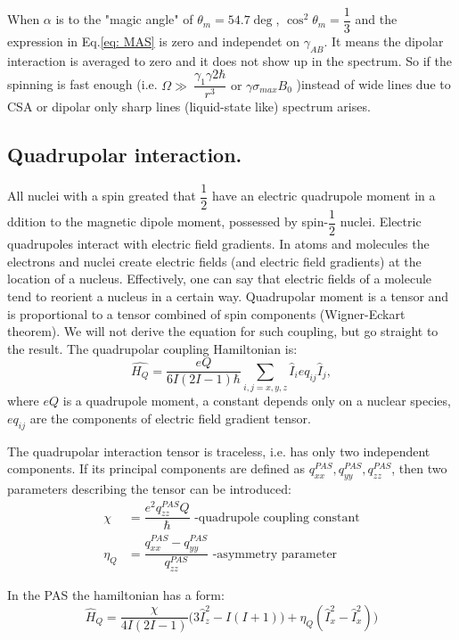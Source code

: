 \documentclass{beamer}
\begin{document}
\begin{frame}
	 When $\alpha$ is to the "magic angle" of $\theta_m =54.7 \deg$, $\cos^2 \theta_m = \dfrac{1}{3}$ and the expression in Eq.\ref{eq: MAS} is zero and independet on $\gamma_{AB}$. It means the dipolar interaction is averaged to zero and it does not show up in the spectrum. 
	 So if the spinning is fast enough (i.e. $\Omega \gg \ \dfrac{\gamma_1 \gamma2 \hbar}{r^3} \text{ or } \gamma \sigma_{max} B_0$  )instead of wide lines due to CSA or dipolar only sharp lines (liquid-state like) spectrum arises. 
\end{frame}

\subsection{Quadrupolar interaction.}
\begin{frame}
	All nuclei with a spin greated that $\dfrac{1}{2}$ have an electric quadrupole moment in a ddition to the magnetic dipole moment, possessed by spin-$\dfrac{1}{2}$ nuclei. Electric quadrupoles interact with electric field gradients. 
	In atoms and molecules the electrons and nuclei create electric fields (and electric field gradients) at the location of a nucleus. Effectively, one can say that electric fields of a molecule tend to reorient a nucleus in a certain way.  Quadrupolar moment is a tensor and is proportional to a tensor combined of spin components (Wigner-Eckart theorem). We will not derive the equation for such coupling, but go straight to the result. The quadrupolar coupling Hamiltonian is:
	\begin{equation}
	   \hat{H_Q} = \dfrac{eQ}{6I(2I-1)\hbar} \sum_{i,j=x,y,z} \hat{I}_i e q_{ij}  \hat{I}_j, 
	\end{equation}
	where $eQ$ is a quadrupole moment, a constant depends only on a nuclear species, $e q_{ij}$ are the components of electric field gradient tensor. 
\end{frame}
\begin{frame}
	
	The quadrupolar interaction tensor is traceless, i.e. has only two independent components. If its principal components are defined as $q_{xx}^{PAS}, q_{yy}^{PAS}, q_{zz}^{PAS}$, then two parameters describing the tensor can be introduced:
	\begin{align}
	   \chi &= \dfrac{e^2 q_{zz}^{PAS} Q}{\hbar}  \text{   -quadrupole coupling constant} \\
	   \eta_Q &= \dfrac{q_{xx}^{PAS} - q_{yy}^{PAS}}{q_{zz}^{PAS}} \text{  -asymmetry parameter}
	\end{align}
	
	In the PAS the hamiltonian has a form:
	\begin{equation}
		\hat{H}_Q = \dfrac{\chi }{4 I (2I-1)}\Big(3 \hat{I}_z^2 - I(I+1) ) + \eta_Q(\hat{I}_x^2 -\hat{I}_x^2)  \Big)
	\end{equation}

\end{frame}	
\end{document}
